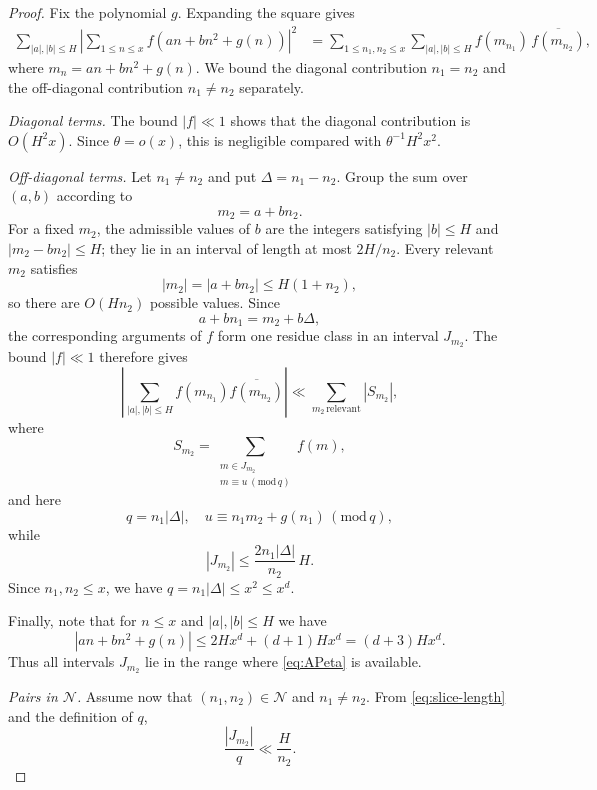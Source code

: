 \documentclass[12pt,reqno]{amsart}
\numberwithin{equation}{section}
\theoremstyle{definition}
\renewcommand{\le}{\leqslant}
\renewcommand{\pmod}[1]{\,(\mathrm{mod}\,#1)}
\begin{document}
\begin{proof}
Fix the polynomial $g$.
Expanding the square gives
\begin{align}\label{eq:second-moment-expanded}
\sum_{|a|,|b|\le H}
\left|\sum_{1\le n\le x} f(an+bn^2+g(n))\right|^2
&=\sum_{1\le n_1,n_2\le x}
\sum_{|a|,|b|\le H}
f(m_{n_1})\,\overline{f(m_{n_2})},
\end{align}
where $m_n=an+bn^2+g(n)$.
We bound the diagonal contribution $n_1=n_2$ and the off-diagonal contribution $n_1\ne n_2$ separately.

\noindent\emph{Diagonal terms.} The bound $|f|\ll1$ shows that the diagonal contribution is $O(H^2x)$.
Since $\theta=o(x)$, this is negligible compared with $\theta^{-1}H^2x^2$.

\noindent\emph{Off-diagonal terms.} Let $n_1\ne n_2$ and put $\Delta=n_1-n_2$.
Group the sum over $(a,b)$ according to
\[
m_2=a+bn_2.
\]
For a fixed $m_2$, the admissible values of $b$ are the integers satisfying $|b|\le H$ and $|m_2-bn_2|\le H$; they lie in an interval of length at most $2H/n_2$.
Every relevant $m_2$ satisfies
\[
|m_2|=|a+bn_2|\le H(1+n_2),
\]
so there are $O(Hn_2)$ possible values.
Since
\[
a+bn_1=m_2+b\Delta,
\]
the corresponding arguments of $f$ form one residue class in an interval $J_{m_2}$.
The bound $|f|\ll1$ therefore gives
\[
\left|\sum_{|a|,|b|\le H}
f(m_{n_1})\overline{f(m_{n_2})}\right|
\ll\sum_{m_2\,\mathrm{relevant}}|S_{m_2}|,
\]
where
\begin{equation}\label{eq:def-slice-sum}
S_{m_2}=
\sum_{\substack{m\in J_{m_2}\\ m\equiv u\pmod q}} f(m),
\end{equation}
and here
\[
q=n_1|\Delta|,
\quad
u\equiv n_1m_2+g(n_1)\pmod q,
\]
while
\begin{equation}\label{eq:slice-length}
|J_{m_2}|\le \frac{2n_1|\Delta|}{n_2}\,H.
\end{equation}
Since $n_1,n_2\le x$, we have $q=n_1|\Delta|\le x^2\le x^d$.

Finally, note that for $n\le x$ and $|a|,|b|\le H$ we have
\[
|an+bn^2+g(n)|
\le 2Hx^d+(d+1)Hx^d
=(d+3)Hx^d.
\]
Thus all intervals $J_{m_2}$ lie in the range where \eqref{eq:APeta} is available.

\noindent\emph{Pairs in $\mathcal N$.} Assume now that $(n_1,n_2)\in\mathcal N$ and $n_1\ne n_2$.
From \eqref{eq:slice-length} and the definition of $q$,
\begin{equation}\label{eq:slice-density}
\frac{|J_{m_2}|}{q}
\ll \frac{H}{n_2}.
\end{equation}


\end{proof}
\end{document}
